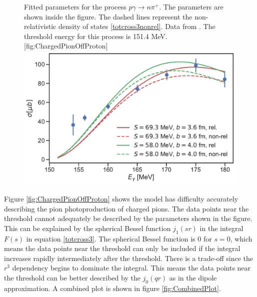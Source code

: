 \begin{figure}[H]
	\begin{sidecaption}{Fitted parameters for the process $p\gamma \rightarrow n\pi^+$. The parameters are shown inside the figure. The dashed lines represent the non-relativistic density of states \eqref{totcross3nonrel}. Data from \cite{PionOffNeutron}. The threshold energy for this process is 151.4 MeV.}[fig:ChargedPionOffProton]
		\includegraphics[width=\linewidth]{Figures/ChargedPionOffProtonExact_fitted.pdf}
	\end{sidecaption}
\end{figure}
Figure \ref{fig:ChargedPionOffProton} shows the model has difficulty accurately describing the pion photoproduction of charged pions. The data points near the threshold cannot adequately be described by the parameters shown in the figure. This can be explained by the spherical Bessel function $j_1(sr)$ in the integral $F(s)$ in equation \eqref{totcross3}. The spherical Bessel function is 0 for $s=0$, which means the data points near the threshold can only be included if the integral increases rapidly intermediately after the threshold. There is a trade-off since the $r^3$ dependency begins to dominate the integral. This means the data points near the threshold can be better described by the $j_0(qr)$ as in the dipole approximation. A combined plot is shown in figure \ref{fig:CombinedPlot}. 
\newpage
